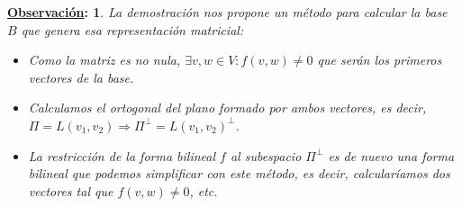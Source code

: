 \documentclass[10pt,a4paper,openright]{book}
\theoremstyle{break}
\newtheorem*{obs}{\underline{Observación}:}
\begin{document}
\begin{obs}
La demostración nos propone un método para calcular la base $B$ que genera esa representación matricial:
\begin{itemize}
\item Como la matriz es no nula, $\exists v,w\in V: f(v,w)\neq 0$ que serán los primeros vectores de la base.
\item Calculamos el ortogonal del plano formado por ambos vectores, es decir, $\Pi = L(v_1,v_2)\Rightarrow \Pi^\perp = L(v_1,v_2)^\perp$.
\item La restricción de la forma bilineal $f$ al subespacio $\Pi^\perp$ es de nuevo una forma bilineal que podemos simplificar con este método, es decir, calcularíamos dos vectores tal que $f(v,w)\neq 0$, etc.
\end{itemize}
\end{obs}
\end{document}
